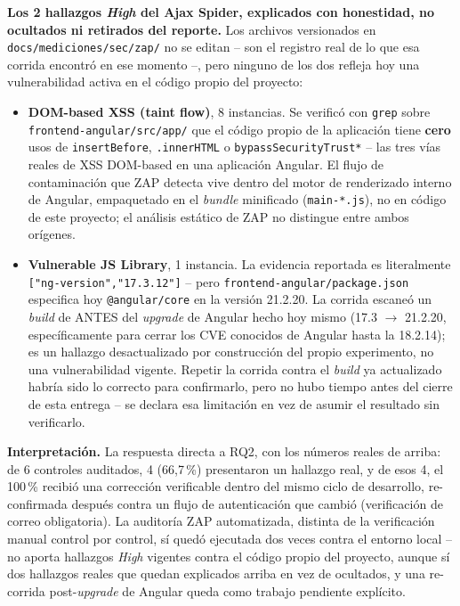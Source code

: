 \textbf{Los 2 hallazgos \emph{High} del Ajax Spider, explicados con
honestidad, no ocultados ni retirados del reporte.} Los archivos
versionados en \texttt{docs/mediciones/sec/zap/} no se editan -- son el
registro real de lo que esa corrida encontró en ese momento --, pero
ninguno de los dos refleja hoy una vulnerabilidad activa en el código
propio del proyecto:

\begin{itemize}[leftmargin=1.2cm]
  \item \textbf{DOM-based XSS (taint flow)}, 8 instancias. Se verificó
    con \texttt{grep} sobre \texttt{frontend-angular/src/app/} que el
    código propio de la aplicación tiene \textbf{cero} usos de
    \texttt{insertBefore}, \texttt{.innerHTML} o
    \texttt{bypassSecurityTrust*} -- las tres vías reales de XSS
    DOM-based en una aplicación Angular. El flujo de contaminación que
    ZAP detecta vive dentro del motor de renderizado interno de
    Angular, empaquetado en el \emph{bundle} minificado
    (\texttt{main-*.js}), no en código de este proyecto; el análisis
    estático de ZAP no distingue entre ambos orígenes.
  \item \textbf{Vulnerable JS Library}, 1 instancia. La evidencia
    reportada es literalmente \texttt{["ng-version","17.3.12"]} -- pero
    \texttt{frontend-angular/package.json} especifica hoy
    \texttt{@angular/core} en la versión 21.2.20. La corrida escaneó un
    \emph{build} de ANTES del \emph{upgrade} de Angular hecho hoy mismo
    (17.3 $\to$ 21.2.20, específicamente para cerrar los CVE conocidos
    de Angular hasta la 18.2.14); es un hallazgo desactualizado por
    construcción del propio experimento, no una vulnerabilidad vigente.
    Repetir la corrida contra el \emph{build} ya actualizado habría sido
    lo correcto para confirmarlo, pero no hubo tiempo antes del cierre
    de esta entrega -- se declara esa limitación en vez de asumir el
    resultado sin verificarlo.
\end{itemize}

\textbf{Interpretación.} La respuesta directa a RQ2, con los números
reales de arriba: de 6 controles auditados, 4 (66,7\,\%) presentaron un
hallazgo real, y de esos 4, el 100\,\% recibió una corrección verificable
dentro del mismo ciclo de desarrollo, re-confirmada después contra un
flujo de autenticación que cambió (verificación de correo obligatoria).
La auditoría ZAP automatizada, distinta de la verificación manual
control por control, sí quedó ejecutada dos veces contra el entorno
local -- no aporta hallazgos \emph{High} vigentes contra el código
propio del proyecto, aunque sí dos hallazgos reales que quedan
explicados arriba en vez de ocultados, y una re-corrida post-\emph{upgrade}
de Angular queda como trabajo pendiente explícito.

